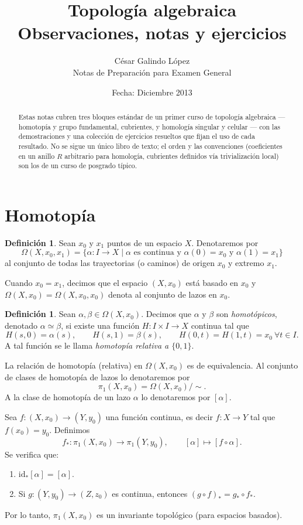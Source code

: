 \documentclass[11pt,a4paper]{article}
\title{\normalfont\bfseries Topología algebraica\\ \large Observaciones, notas y ejercicios}
\author{César Galindo López\\ \normalsize Notas de Preparación para Examen General}
\date{\normalsize Fecha: Diciembre 2013}
\theoremstyle{plain}
\theoremstyle{definition}
\newtheorem{definition}[theorem]{Definición}
\theoremstyle{remark}
\begin{document}
\maketitle

\begin{abstract}
\noindent Estas notas cubren tres bloques estándar de un primer curso de
topología algebraica --- homotopía y grupo fundamental, cubrientes, y
homología singular y celular --- con las demostraciones y una colección de
ejercicios resueltos que fijan el uso de cada resultado. No se sigue un
único libro de texto; el orden y las convenciones (coeficientes en un
anillo $R$ arbitrario para homología, cubrientes definidos vía trivialización
local) son los de un curso de posgrado típico.
\end{abstract}

\tableofcontents

\section{Homotopía}

\begin{definition}
\label{def:caminos}
Sean $x_0$ y $x_1$ puntos de un espacio $X$. Denotaremos por
\[
\Omega(X,x_0,x_1) = \{\alpha : I \to X \mid \alpha \text{ es continua y } \alpha(0)=x_0 \text{ y } \alpha(1)=x_1\}
\]
al conjunto de todas las trayectorias (o caminos) de origen $x_0$ y extremo $x_1$.

Cuando $x_0=x_1$, decimos que el espacio $(X,x_0)$ está basado en $x_0$ y
$\Omega(X,x_0)=\Omega(X,x_0,x_0)$ denota al conjunto de lazos en $x_0$.
\end{definition}

\begin{definition}
\label{def:homotopia-lazos}
Sean $\alpha,\beta\in\Omega(X,x_0)$. Decimos que $\alpha$ y $\beta$ son
\emph{homotópicos}, denotado $\alpha\simeq\beta$, si existe una función
$H : I\times I \to X$ continua tal que
\[
H(s,0)=\alpha(s), \qquad H(s,1)=\beta(s), \qquad H(0,t)=H(1,t)=x_0 \ \forall t\in I.
\]
A tal función se le llama \emph{homotopía relativa a $\{0,1\}$}.

La relación de homotopía (relativa) en $\Omega(X,x_0)$ es de equivalencia.
Al conjunto de clases de homotopía de lazos lo denotaremos por
\[
\pi_1(X,x_0) = \Omega(X,x_0)/\!\sim.
\]
A la clase de homotopía de un lazo $\alpha$ lo denotaremos por $[\alpha]$.

Sea $f:(X,x_0)\to(Y,y_0)$ una función continua, es decir $f:X\to Y$ tal que
$f(x_0)=y_0$. Definimos
\[
f_* : \pi_1(X,x_0)\to\pi_1(Y,y_0), \qquad [\alpha]\mapsto[f\circ\alpha].
\]
Se verifica que:
\begin{enumerate}[label=\arabic*.]
\item $\mathrm{id}_*[\alpha]=[\alpha]$.
\item Si $g:(Y,y_0)\to(Z,z_0)$ es continua, entonces $(g\circ f)_*=g_*\circ f_*$.
\end{enumerate}
Por lo tanto, $\pi_1(X,x_0)$ es un invariante topológico (para espacios basados).
\end{definition}
\end{document}
